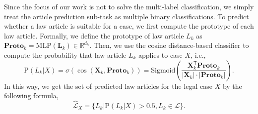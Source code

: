 Since the focus of our work is not to solve the multi-label classification, we simply treat the article prediction sub-task as multiple binary classifications.
To predict whether a law article is suitable for a case, we first compute the prototype of each law article.
Formally, we define the prototype of law article $L_k$ as $\mathbf{Proto}_k = \text{MLP}(\mathbf{L}_k) \in \mathbb{R}^{d_h}$.
Then, we use the cosine distance-based classifier to compute the probability that law article $L_k$ applies to case $X$, i.e.,
\begin{equation} \label{eq: article prediction}
\text{P}(L_k|X) = \sigma \left( \cos \left( \mathbf{X}_k, \mathbf{Proto}_k \right) \right)= \text{Sigmoid}\left(\frac{\mathbf{X}_k^\mathsf{T} \mathbf{Proto}_k}
{ |\mathbf{X}_k| \cdot |\mathbf{Proto}_k|}\right).
\end{equation}
In this way, we get the set of predicted law articles for the legal case $X$ by the following formula,
\[
\hat{\mathcal{L}}_X = \{ L_k | \text{P}(L_k|X) > 0.5, L_k \in \mathcal{L}\}.
\]

